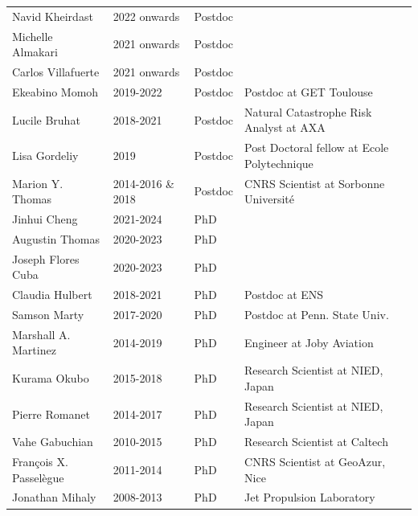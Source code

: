 \documentclass[10pt]{article}
\begin{document}
\begin{table}[h!]
 \renewcommand{\arraystretch}{0.9}
\begin{tabular}{L{4cm}L{3cm}L{2cm}D{6cm}}
\color{groy}Navid Kheirdast       & 2022 onwards      &  Postdoc    &  \\
\color{groy}Michelle Almakari     & 2021 onwards      &  Postdoc    &  \\
\color{groy}Carlos Villafuerte    & 2021 onwards      &  Postdoc    &  \\
\color{gray}Ekeabino Momoh   	  & 2019-2022         &  Postdoc    &  Postdoc at GET Toulouse\\
\color{gray}Lucile Bruhat    	  & 2018-2021         &  Postdoc    &  Natural Catastrophe Risk Analyst at AXA\\
\color{gray}Lisa Gordeliy    	  & 2019              &  Postdoc    &  Post Doctoral fellow at Ecole Polytechnique\\
\color{gray}Marion Y. Thomas 	  & 2014-2016 \& 2018 &  Postdoc    &  CNRS Scientist at Sorbonne Université\\[16pt]
\color{groy}Jinhui Cheng          & 2021-2024		  &  PhD        &   \\
\color{groy}Augustin Thomas       & 2020-2023		  &  PhD        &   \\
\color{groy}Joseph Flores Cuba    & 2020-2023		  &  PhD        &   \\
\color{gray}Claudia Hulbert    	  & 2018-2021         &  PhD        &  Postdoc at ENS\\
\color{gray}Samson Marty    	      & 2017-2020         &  PhD        &  Postdoc at Penn. State Univ.\\
\color{gray}Marshall A. Martinez  & 2014-2019         &  PhD        &  Engineer at Joby Aviation \\
\color{gray}Kurama Okubo    	      & 2015-2018         &  PhD        &  Research Scientist at NIED, Japan\\
\color{gray}Pierre Romanet        & 2014-2017         &  PhD        &  Research Scientist at NIED, Japan\\
\color{gray}Vahe Gabuchian		  & 2010-2015         &  PhD        &  Research Scientist at Caltech\\
\color{gray}François X. Passelègue& 2011-2014         &  PhD        &  CNRS Scientist at GeoAzur, Nice\\
\color{gray}Jonathan Mihaly       & 2008-2013         &  PhD        &  Jet Propulsion Laboratory\\

\end{tabular}
\end{table}
\end{document}
